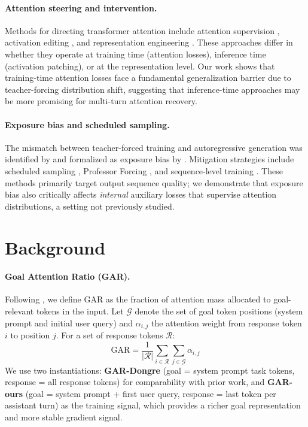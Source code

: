 \documentclass[11pt]{article}
\begin{document}
\paragraph{Attention steering and intervention.}
Methods for directing transformer attention include attention supervision \citep{liu2016attention}, activation editing \citep{meng2022locating, li2024inference}, and representation engineering \citep{zou2023representation}. These approaches differ in whether they operate at training time (attention losses), inference time (activation patching), or at the representation level. Our work shows that training-time attention losses face a fundamental generalization barrier due to teacher-forcing distribution shift, suggesting that inference-time approaches may be more promising for multi-turn attention recovery.

\paragraph{Exposure bias and scheduled sampling.}
The mismatch between teacher-forced training and autoregressive generation was identified by \citet{williams1989learning} and formalized as exposure bias by \citet{ranzato2016sequence}. Mitigation strategies include scheduled sampling \citep{bengio2015scheduled}, Professor Forcing \citep{lamb2016professor}, and sequence-level training \citep{leblond2018searnn, ranzato2016sequence}. These methods primarily target output sequence quality; we demonstrate that exposure bias also critically affects \emph{internal} auxiliary losses that supervise attention distributions, a setting not previously studied.

\section{Background}
\label{sec:background}

\paragraph{Goal Attention Ratio (GAR).}
Following \citet{dongre2026}, we define GAR as the fraction of attention mass allocated to goal-relevant tokens in the input. Let $\mathcal{G}$ denote the set of goal token positions (system prompt and initial user query) and $\alpha_{i,j}$ the attention weight from response token $i$ to position $j$. For a set of response tokens $\mathcal{R}$:
\begin{equation}
    \text{GAR} = \frac{1}{|\mathcal{R}|} \sum_{i \in \mathcal{R}} \sum_{j \in \mathcal{G}} \alpha_{i,j}
\end{equation}
We use two instantiations: \textbf{GAR-Dongre} (goal = system prompt task tokens, response = all response tokens) for comparability with prior work, and \textbf{GAR-ours} (goal = system prompt + first user query, response = last token per assistant turn) as the training signal, which provides a richer goal representation and more stable gradient signal.
\end{document}
